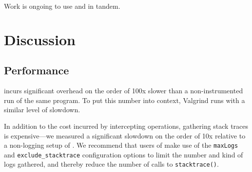 \documentclass{juliacon}
\begin{document}
Work is ongoing to use \GPUFPX{} and \FT{} in tandem.







\section{Discussion}
\label{s:discussion}

\subsection{Performance}
\label{s:discussion-performance}

\FT{} incurs significant overhead on the order of 100x slower than a non-instrumented run of the same program.
To put this number into context, Valgrind runs with a similar level of slowdown.

In addition to the cost incurred by intercepting \fp{} operations, gathering stack traces is expensive---we measured a significant slowdown on the order of 10x relative to a non-logging setup of \FT{}.
We recommend that users of \FT{} make use of the \texttt{maxLogs} and \texttt{exclude\_stacktrace} configuration options to limit the number and kind of logs gathered, and thereby reduce the number of calls to \texttt{stacktrace()}.
\end{document}
